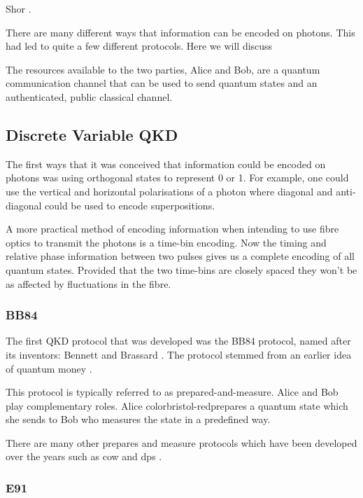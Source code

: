 Shor \cite{shor1994}.

There are many different ways that information can be encoded on photons. This had led to quite a few different protocols. Here we will discuss 

The resources available to the two parties, Alice and Bob, are a quantum communication channel that can be used to send quantum states and an authenticated, public classical channel. 

\subsection{Discrete Variable QKD}

The first ways that it was conceived that information could be encoded on photons was using orthogonal states to represent 0 or 1. For example, one could use the vertical and horizontal polarisations of a photon where diagonal and anti-diagonal could be used to encode superpositions. 

A more practical method of encoding information when intending to use fibre optics to transmit the photons is a time-bin encoding. Now the timing and relative phase information between two pulses gives us a complete encoding of all quantum states. Provided that the two time-bins are closely spaced they won't be as affected by fluctuations in the fibre.

\subsubsection*{BB84}

The first \ac{QKD} protocol that was developed was the BB84 protocol, named after its inventors: Bennett and Brassard \cite{BB84}. The protocol stemmed from an earlier idea of quantum money \cite{quantum_money}.

This protocol is typically referred to as {\color{bristol-red}prepared-and-measure}. Alice and Bob play complementary roles. Alice {color{bristol-red}prepares} a quantum state which she sends to Bob who {\color{bristol-red}measures} the state in a predefined way. 

There are many other prepares and measure protocols which have been developed over the years such as \ac{cow} \cite{COW-QKD} and \ac{dps} \cite{DPS-QKD}.

\subsubsection*{E91}

